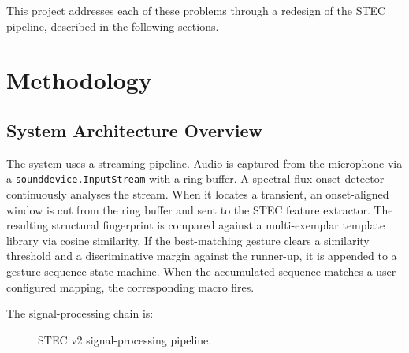 \documentclass[12pt,a4paper]{article}
\begin{document}
This project addresses each of these problems through a redesign of the STEC pipeline, described in the following sections.

\section{Methodology}

\subsection{System Architecture Overview}

The system uses a streaming pipeline. Audio is captured from the microphone via a \texttt{sounddevice.InputStream} with a ring buffer. A spectral-flux onset detector continuously analyses the stream. When it locates a transient, an onset-aligned window is cut from the ring buffer and sent to the STEC feature extractor. The resulting structural fingerprint is compared against a multi-exemplar template library via cosine similarity. If the best-matching gesture clears a similarity threshold and a discriminative margin against the runner-up, it is appended to a gesture-sequence state machine. When the accumulated sequence matches a user-configured mapping, the corresponding macro fires.

The signal-processing chain is:

\begin{figure}[ht]
\centering
{}
\caption{STEC v2 signal-processing pipeline.}
\label{fig:pipeline}
\end{figure}
\end{document}
